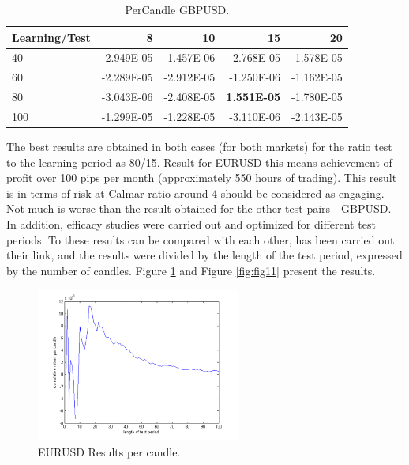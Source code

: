 \documentclass[runningheads,a4paper]{llncs}
\begin{document}
\begin{table}[h!]
\centering
\caption{PerCandle GBPUSD.}
\label{tab:tab4}
\begin{tabular}{|l|r|r|r|r|} \hline
Learning/Test &	8	 & 	10 &		15	 &	20\\ \hline
40	 & -2.949E-05 & 	1.457E-06 & 	-2.768E-05	 & -1.578E-05\\ \hline
60	 & -2.289E-05 & 	-2.912E-05 & 	-1.250E-06 & 	-1.162E-05\\ \hline
80	 & -3.043E-06 & 	-2.408E-05	 & \textbf{1.551E-05} & 	-1.780E-05\\ \hline
100	 & -1.299E-05 & 	-1.228E-05 & 	-3.110E-06	 & -2.143E-05\\ \hline
\end{tabular}
\end{table}
\FloatBarrier


The best results are obtained in both cases (for both markets) for the ratio test to the learning period as 80/15. Result for EURUSD this means achievement of profit over 100 pips per month (approximately 550 hours of trading). This result is in terms of risk at Calmar ratio around 4 should be considered as engaging. Not much is worse than the result obtained for the other test pairs - GBPUSD.\\

In addition, efficacy studies were carried out and optimized for different test periods. To these results can be compared with each other, has been carried out their link, and the results were divided by the length of the test period, expressed by the number of candles. 
Figure \ref{fig:fig10} and Figure \ref{fig:fig11} present the results.

\begin{figure}[h!]
\centering
\includegraphics[width = 0.6\textwidth]{figures/rys10.png}
\caption{EURUSD Results per candle.}
\label{fig:fig10}
\end{figure}
\FloatBarrier
\end{document}
